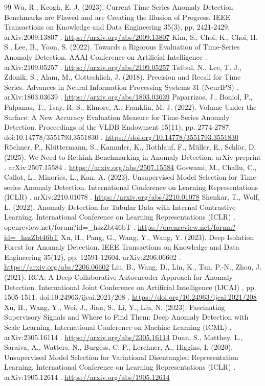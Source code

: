\documentclass[3p,twocolumn]{elsarticle}
\begin{document}
\begin{thebibliography}{99}
\label{r30} Wu, R., Keogh, E. J. (2023). Current Time Series Anomaly Detection Benchmarks are Flawed and are Creating the Illusion of Progress. IEEE Transactions on Knowledge and Data Engineering 35(3), pp. 2421-2429. arXiv:2009.13807 . \url{https://arxiv.org/abs/2009.13807}
\label{r31} Kim, S., Choi, K., Choi, H.-S., Lee, B., Yoon, S. (2022). Towards a Rigorous Evaluation of Time-Series Anomaly Detection. AAAI Conference on Artificial Intelligence . arXiv:2109.05257 . \url{https://arxiv.org/abs/2109.05257}
\label{r32} Tatbul, N., Lee, T. J., Zdonik, S., Alam, M., Gottschlich, J. (2018). Precision and Recall for Time Series. Advances in Neural Information Processing Systems 31 (NeurIPS) . arXiv:1803.03639 . \url{https://arxiv.org/abs/1803.03639}
\label{r33} Paparrizos, J., Boniol, P., Palpanas, T., Tsay, R. S., Elmore, A., Franklin, M. J. (2022). Volume Under the Surface: A New Accuracy Evaluation Measure for Time-Series Anomaly Detection. Proceedings of the VLDB Endowment 15(11), pp. 2774-2787. doi:10.14778/3551793.3551830 . \url{https://doi.org/10.14778/3551793.3551830}
\label{r34} Röchner, P., Klüttermann, S., Kammler, K., Rothlauf, F., Müller, E., Schlör, D. (2025). We Need to Rethink Benchmarking in Anomaly Detection. arXiv preprint . arXiv:2507.15584 . \url{https://arxiv.org/abs/2507.15584}
\label{r35} Goswami, M., Challu, C., Callot, L., Minorics, L., Kan, A. (2023). Unsupervised Model Selection for Time-series Anomaly Detection. International Conference on Learning Representations (ICLR) . arXiv:2210.01078 . \url{https://arxiv.org/abs/2210.01078}
\label{r36} Shenkar, T., Wolf, L. (2022). Anomaly Detection for Tabular Data with Internal Contrastive Learning. International Conference on Learning Representations (ICLR) . openreview.net/forum?id=\_hszZbt46bT . \url{https://openreview.net/forum?id=\_hszZbt46bT}
\label{r37} Xu, H., Pang, G., Wang, Y., Wang, Y. (2023). Deep Isolation Forest for Anomaly Detection. IEEE Transactions on Knowledge and Data Engineering 35(12), pp. 12591-12604. arXiv:2206.06602 . \url{https://arxiv.org/abs/2206.06602}
\label{r38} Liu, B., Wang, D., Lin, K., Tan, P.-N., Zhou, J. (2021). RCA: A Deep Collaborative Autoencoder Approach for Anomaly Detection. International Joint Conference on Artificial Intelligence (IJCAI) , pp. 1505-1511. doi:10.24963/ijcai.2021/208 . \url{https://doi.org/10.24963/ijcai.2021/208}
\label{r39} Xu, H., Wang, Y., Wei, J., Jian, S., Li, Y., Liu, N. (2023). Fascinating Supervisory Signals and Where to Find Them: Deep Anomaly Detection with Scale Learning. International Conference on Machine Learning (ICML) . arXiv:2305.16114 . \url{https://arxiv.org/abs/2305.16114}
\label{r40} Duan, S., Matthey, L., Saraiva, A., Watters, N., Burgess, C. P., Lerchner, A., Higgins, I. (2020). Unsupervised Model Selection for Variational Disentangled Representation Learning. International Conference on Learning Representations (ICLR) . arXiv:1905.12614 . \url{https://arxiv.org/abs/1905.12614}
\end{thebibliography}
\end{document}
